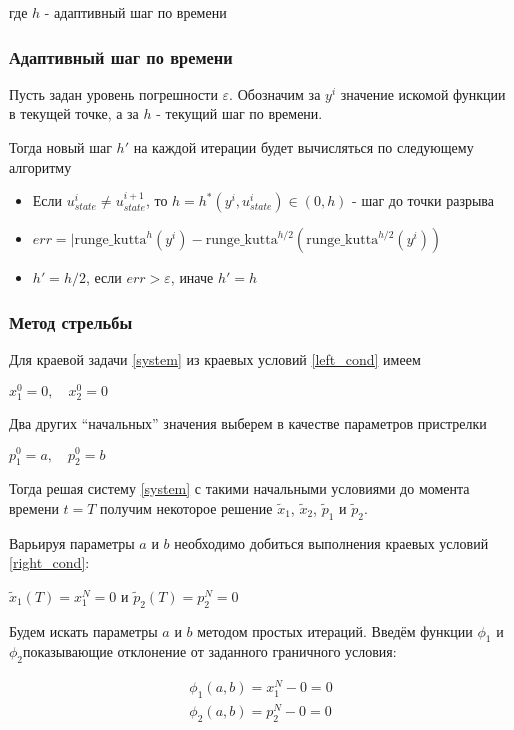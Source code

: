 \documentclass[a4paper,12pt]{article}
\begin{document}
где \(h\) - адаптивный шаг по времени

\subsubsection{Адаптивный шаг по времени}

Пусть задан уровень погрешности \(\varepsilon\). Обозначим за \(y^i\)
значение искомой функции в текущей точке, а за \(h\) - текущий шаг по
времени.

Тогда новый шаг \(h'\) на каждой итерации будет вычисляться по следующему
алгоритму

\begin{itemize}
  \item
        Если \(u_{state}^i \neq u_{state}^{i+1}\), то \(h=h^*(y^i, u_{state}^i)\in(0, h)\) - шаг до точки разрыва
  \item
        \(err =|\text{runge\_kutta}^h(y^i)-\text{runge\_kutta}^{h/2}\left(\text{runge\_kutta}^{h/2}(y^i)\right)\)
  \item
        \(h'=h/2\), если \(err > \varepsilon\), иначе \(h'=h\)
\end{itemize}

\subsubsection{Метод стрельбы}

Для краевой задачи \cref{system} из краевых условий \cref{left_cond} имеем

\(x_1^0=0, \quad x_2^0=0\)

Два других ``начальных'' значения выберем в качестве параметров
пристрелки

\(p_1^0=a, \quad p_2^0=b\)

Тогда решая систему \cref{system} с такими начальными условиями до момента
времени \(t=T\) получим некоторое решение \(\tilde{x}_1\),
\(\tilde{x}_2\), \(\tilde{p}_1\) и \(\tilde{p}_2\).

Варьируя параметры \(a\) и \(b\) необходимо добиться выполнения краевых
условий \cref{right_cond}:

\(\tilde{x}_1(T)=x_1^N=0\) и \(\tilde{p}_2(T)=p_2^N=0\)

Будем искать параметры \(a\) и \(b\) методом простых итераций. Введём
функции \(\phi_1\) и \(\phi_2\)показывающие отклонение от заданного
граничного условия:

\begin{gather*}
  \phi_1(a,b)=x_1^N-0=0\\
  \phi_2(a,b)=p_2^N-0=0
\end{gather*}
\end{document}
